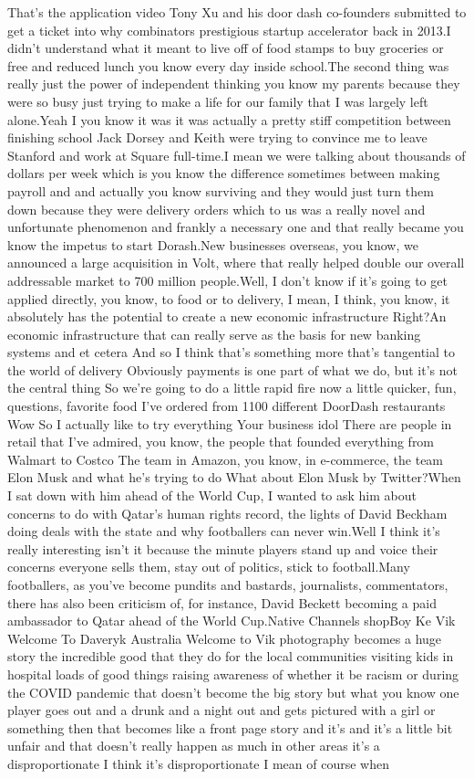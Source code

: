 \documentclass{article}%
\begin{document}
That's the application video Tony Xu and his door dash co{-}founders submitted to get a ticket into why combinators prestigious startup accelerator back in 2013.I didn't understand what it meant to live off of food stamps to buy groceries or free and reduced lunch you know every day inside school.The second thing was really just the power of independent thinking you know my parents because they were so busy just trying to make a life for our family that I was largely left alone.Yeah I you know it was it was actually a pretty stiff competition between finishing school Jack Dorsey and Keith were trying to convince me to leave Stanford and work at Square full{-}time.I mean we were talking about thousands of dollars per week which is you know the difference sometimes between making payroll and and actually you know surviving and they would just turn them down because they were delivery orders which to us was a really novel and unfortunate phenomenon and frankly a necessary one and that really became you know the impetus to start Dorash.New businesses overseas, you know, we announced a large acquisition in Volt, where that really helped double our overall addressable market to 700 million people.Well, I don't know if it's going to get applied directly, you know, to food or to delivery, I mean, I think, you know, it absolutely has the potential to create a new economic infrastructure Right?An economic infrastructure that can really serve as the basis for new banking systems and et cetera And so I think that's something more that's tangential to the world of delivery Obviously payments is one part of what we do, but it's not the central thing So we're going to do a little rapid fire now a little quicker, fun, questions, favorite food I've ordered from 1100 different DoorDash restaurants Wow So I actually like to try everything Your business idol There are people in retail that I've admired, you know, the people that founded everything from Walmart to Costco The team in Amazon, you know, in e{-}commerce, the team Elon Musk and what he's trying to do What about Elon Musk by Twitter?When I sat down with him ahead of the World Cup, I wanted to ask him about concerns to do with Qatar's human rights record, the lights of David Beckham doing deals with the state and why footballers can never win.Well I think it's really interesting isn't it because the minute players stand up and voice their concerns everyone sells them, stay out of politics, stick to football.Many footballers, as you've become pundits and bastards, journalists, commentators, there has also been criticism of, for instance, David Beckett becoming a paid ambassador to Qatar ahead of the World Cup.Native Channels shopBoy Ke  Vik Welcome To Daveryk Australia Welcome to Vik photography becomes a huge story the incredible good that they do for the local communities visiting kids in hospital loads of good things raising awareness of whether it be racism or during the COVID pandemic that doesn't become the big story but what you know one player goes out and a drunk and a night out and gets pictured with a girl or something then that becomes like a front page story and it's and it's a little bit unfair and that doesn't really happen as much in other areas it's a disproportionate I think it's disproportionate I mean of course when 
\end{document}
